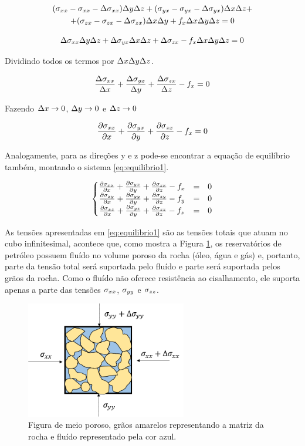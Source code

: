\begin{multline} \label{eq:equilibrio0}
   (\stxx - \stxx - \Delta \stxx) \Dy\Dz + (\styx - \styx - \Delta \styx)\Dx\Dz  +\\
   + (\stzx - \stzx - \Delta\stzx) \Dx\Dy + f_x\Dx\Dy\Dz = 0
\end{multline}


\begin{equation}
 \Delta \stxx \Dy\Dz + \Delta \styx\Dx\Dz + \Delta\stzx - f_x\Dx\Dy\Dz = 0
\end{equation}

Dividindo todos os termos por $\Dx\Dy\Dz$.


\begin{equation}
\frac{ \Delta \stxx }{ \Dx } + \frac{\Delta \styx}{ \Dy } + \frac{\Delta\stzx}{ \Dz } - f_x = 0
\end{equation}

Fazendo $\Dx \rightarrow 0$, $\Dy \rightarrow 0 $ e $\Dz \rightarrow 0$

\begin{equation}
\dx[\stxx] + \dy[\styx] + \dz[\stzx] - f_x = 0
\end{equation}

Analogamente, para as direções y e z pode-se encontrar a equação de equilíbrio também, montando o sistema \eqref{eq:equilibrio1}.

\begin{equation}
\label{eq:equilibrio1}
\left\{\begin{matrix}
 \dx[\stxx] + \dy[\styx] + \dz[\stzx] - f_x & = & 0\\
 \dx[\stxy] + \dy[\styy] + \dz[\stzy] - f_y & = & 0\\
 \dx[\stxz] + \dy[\styz] + \dz[\stzz] - f_z & = & 0
\end{matrix}\right.
\end{equation}


As tensões apresentadas em \eqref{eq:equilibrio1} são as tensões totais que atuam no cubo infinitesimal, acontece que, como mostra a Figura \ref{fig:rochaComFluido}, os reservatórios de petróleo possuem fluído no volume poroso da rocha (óleo, água e gás) e, portanto, parte da tensão total será suportada pelo fluído e parte será suportada pelos grãos da rocha. Como o fluído não oferece resistência ao cisalhamento, ele suporta apenas a parte das tensões $\stxx$, $\styy$ e $\stzz$.

\begin{figure}[!htbp]
\centering
\includegraphics[width=7cm]{chap01/figs/fluido_rocha_tensoes.png}
\caption{Figura de meio poroso, grãos amarelos representando a matriz da rocha e fluído representado pela cor azul.}
\label{fig:rochaComFluido}
\end{figure}

